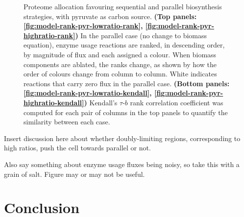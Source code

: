 \begin{figure}
  \caption{
    Proteome allocation favouring sequential and parallel biosynthesis strategies, with pyruvate as carbon source.
    \textbf{(Top panels: \ref{fig:model-rank-pyr-lowratio-rank}, \ref{fig:model-rank-pyr-highratio-rank})} In the parallel case (no change to biomass equation), enzyme usage reactions are ranked, in descending order, by magnitude of flux and each assigned a colour.
    When biomass components are ablated, the ranks change, as shown by how the order of colours change from column to column.
    White indicates reactions that carry zero flux in the parallel case.
    \textbf{(Bottom panels: \ref{fig:model-rank-pyr-lowratio-kendall}, \ref{fig:model-rank-pyr-highratio-kendall})} Kendall's $\tau$-$b$ rank correlation coefficient was computed for each pair of columns in the top panels to quantify the similarity between each case.
  }
  \label{fig:model-rank-pyr}
\end{figure}

Insert discussion here about whether doubly-limiting regions, corresponding to high ratios, push the cell towards parallel or not.

Also say something about enzyme usage fluxes being noisy, so take this with a grain of salt.
Figure may or may not be useful.

\section{Conclusion}
\label{subsec:model-conclusion}


